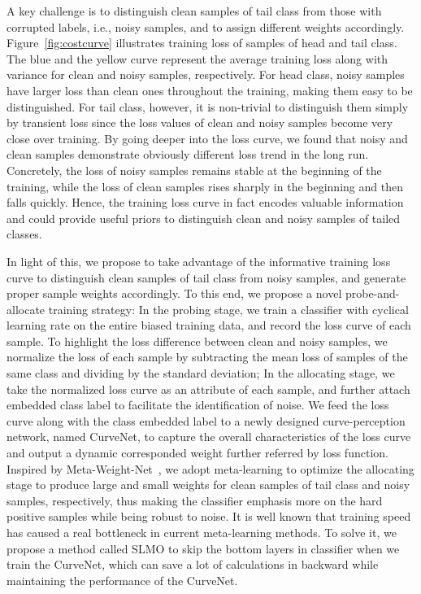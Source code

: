 \documentclass[letterpaper]{article} %
\begin{document}
A key challenge is to distinguish clean samples of tail class from those with corrupted labels, i.e., noisy samples, and to assign different weights accordingly. Figure~\ref{fig:costcurve} illustrates training loss of samples of head and tail class. The blue and the yellow curve represent the average training loss along with variance for clean and noisy samples, respectively. For head class, noisy samples have larger loss than clean ones throughout the training, making them easy to be distinguished. For tail class, however, it is non-trivial to distinguish them simply by transient loss since the loss values of clean and noisy samples become very close over training. By going deeper into the loss curve, we found that noisy and clean samples demonstrate obviously different loss trend in the long run. Concretely, the loss of noisy samples remains stable at the beginning of the training, while the loss of clean samples rises sharply in the beginning and then falls quickly. Hence, the training loss curve in fact encodes valuable information and could provide useful priors to distinguish clean and noisy samples of tailed classes.

In light of this, we propose to take advantage of the informative training loss curve to distinguish clean samples of tail class from noisy samples, and generate proper sample weights accordingly. To this end, we propose a novel probe-and-allocate training strategy: In the probing stage, we train a classifier with cyclical learning rate on the entire biased training data, and record the loss curve of each sample. To highlight the loss difference between clean and noisy samples, we normalize the loss of each sample by subtracting the mean loss of samples of the same class and dividing by the standard deviation; In the allocating stage, we take the normalized loss curve as an attribute of each sample, and further attach embedded class label to facilitate the identification of noise. We feed the loss curve along with the class embedded label to a newly designed curve-perception network, named CurveNet, to capture the overall characteristics of the loss curve and output a dynamic corresponded weight further referred by loss function. Inspired by Meta-Weight-Net~\cite{shu2019meta}, we adopt meta-learning to optimize the allocating stage to produce large and small weights for clean samples of tail class and noisy samples, respectively, thus making the classifier emphasis more on the hard positive samples while being robust to noise.
It is well known that training speed has caused a real bottleneck in current meta-learning methods.
To solve it, we propose a method called SLMO to skip the bottom layers in classifier when we train the CurveNet, which can save a lot of calculations in backward while maintaining the performance of the CurveNet.
\end{document}
